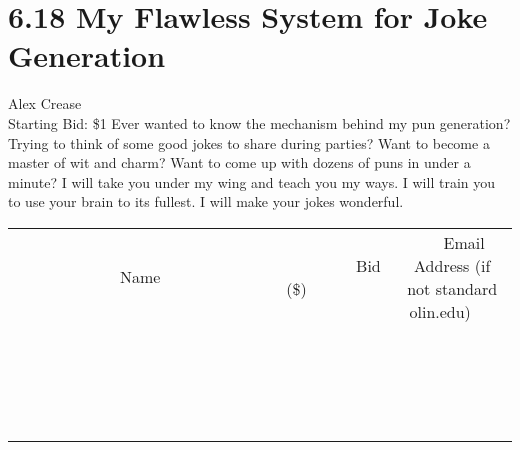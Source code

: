 \documentclass[11pt]{article}
\begin{document}
\section*{6.18 My Flawless System for Joke Generation}
Alex Crease
\\
Starting Bid: \$1
\newline
Ever wanted to know the mechanism behind my pun generation? Trying to think of some good jokes to share during parties? Want to become a master of wit and charm? Want to come up with dozens of puns in under a minute? I will take you under my wing and teach you my ways. I will train you to use your brain to its fullest. I will make your jokes wonderful.
\\[3ex]
\begin{tabular}{c c c}
~~~~~~~~~~~~~Name~~~~~~~~~~~~~ & ~~~~~~~~~Bid (\$)~~~~~~~~~  & ~~~Email Address (if not standard olin.edu)~~~\\
 & & \\
\hline
 & & \\
\hline
 & & \\
\hline
 & & \\
\hline
 & & \\
\hline
 & & \\
\hline
 & & \\
\hline
 & & \\
\hline
 & & \\
\hline
 & & \\
\hline
 & & \\
\hline
 & & \\
\hline
 & & \\
\hline
 & & \\
\hline
 & & \\
\hline
 & & \\
\hline
 & & \\
\hline
 & & \\
\hline
 & & \\
\hline
\end{tabular}
\newpage
\end{document}
